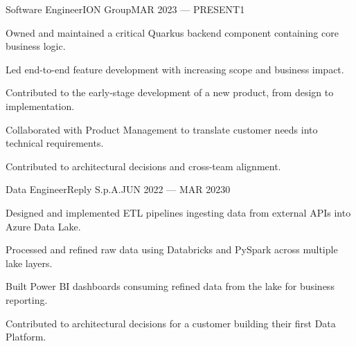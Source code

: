 
\begin{cventry}{Software Engineer}{ION Group}{MAR 2023 — PRESENT}{1}
\begin{tasks}
  \item Owned and maintained a critical Quarkus backend component containing core business logic.
  \item Led end-to-end feature development with increasing scope and business impact.
  \item Contributed to the early-stage development of a new product, from design to implementation.
  \item Collaborated with Product Management to translate customer needs into technical requirements.
  \item Contributed to architectural decisions and cross-team alignment.
\end{tasks}
\end{cventry}

\begin{cventry}{Data Engineer}{Reply S.p.A.}{JUN 2022 — MAR 2023}{0}
\begin{tasks}
  \item Designed and implemented ETL pipelines ingesting data from external APIs into Azure Data Lake.
  \item Processed and refined raw data using Databricks and PySpark across multiple lake layers.
  \item Built Power BI dashboards consuming refined data from the lake for business reporting.
  \item Contributed to architectural decisions for a customer building their first Data Platform.
\end{tasks}
\end{cventry}

